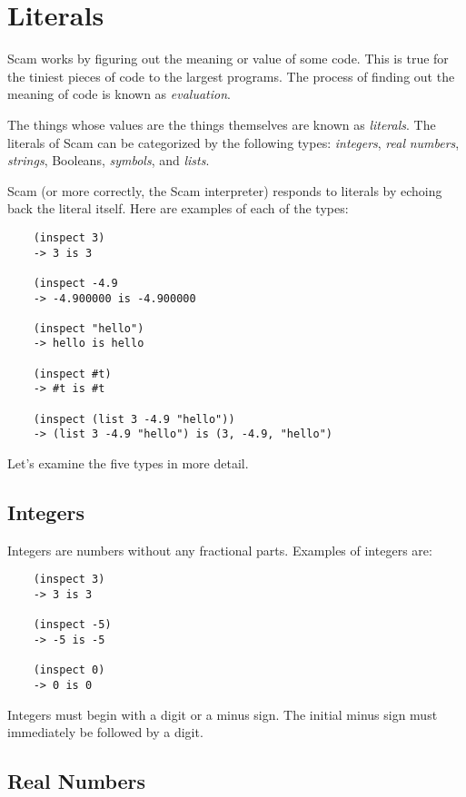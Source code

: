 \chapter{Literals}
\label{Literals}

Scam works by figuring out the meaning or value of some code.
This is true for the tiniest pieces of code to the largest
programs. The process of finding out the meaning of code
is known as {\it evaluation}.

The things whose values are the things themselves are known as
{\it literals}. The literals of Scam can be categorized by the following
types:
{\it integers}, {\it real} {\it numbers}, {\it strings}, {\sc Booleans},
{\it symbols}, and {\it lists}.

Scam (or more correctly, the Scam interpreter) responds to literals
by echoing back the literal itself.
Here are examples of each of the types:

\begin{verbatim}
    (inspect 3)
    -> 3 is 3
     
    (inspect -4.9
    -> -4.900000 is -4.900000
     
    (inspect "hello")
    -> hello is hello
     
    (inspect #t)
    -> #t is #t

    (inspect (list 3 -4.9 "hello"))
    -> (list 3 -4.9 "hello") is (3, -4.9, "hello")
\end{verbatim}
Let's examine the
five types in more detail.

\section{Integers}

Integers are numbers without any fractional parts.
Examples of integers are:

\begin{verbatim}
    (inspect 3)
    -> 3 is 3
    
    (inspect -5)
    -> -5 is -5
    
    (inspect 0)
    -> 0 is 0
\end{verbatim}

Integers must begin with a digit or a minus sign. The initial minus sign
must immediately be followed by a digit.

\section{Real Numbers}

